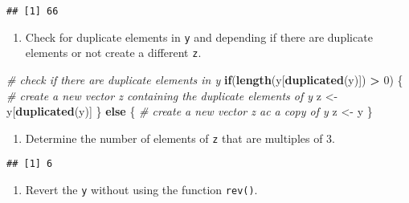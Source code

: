 \documentclass[
]{article}
\newenvironment{Shaded}{\begin{snugshade}}{\end{snugshade}}
\newcommand{\CommentTok}[1]{\textcolor[rgb]{0.56,0.35,0.01}{\textit{#1}}}
\newcommand{\ControlFlowTok}[1]{\textcolor[rgb]{0.13,0.29,0.53}{\textbf{#1}}}
\newcommand{\DecValTok}[1]{\textcolor[rgb]{0.00,0.00,0.81}{#1}}
\newcommand{\KeywordTok}[1]{\textcolor[rgb]{0.13,0.29,0.53}{\textbf{#1}}}
\newcommand{\NormalTok}[1]{#1}
\newcommand{\OperatorTok}[1]{\textcolor[rgb]{0.81,0.36,0.00}{\textbf{#1}}}
\newcommand{\StringTok}[1]{\textcolor[rgb]{0.31,0.60,0.02}{#1}}
\providecommand{\tightlist}{%
  \setlength{\itemsep}{0pt}\setlength{\parskip}{0pt}}
\begin{document}
\begin{verbatim}
## [1] 66
\end{verbatim}

\begin{enumerate}
\def\labelenumi{\arabic{enumi}.}
\setcounter{enumi}{2}
\tightlist
\item
  Check for duplicate elements in \texttt{y} and depending if there are
  duplicate elements or not create a different \texttt{z}.
\end{enumerate}

\begin{Shaded}
\begin{Highlighting}[]
\CommentTok{# check if there are duplicate elements in y}
\ControlFlowTok{if}\NormalTok{(}\KeywordTok{length}\NormalTok{(y[}\KeywordTok{duplicated}\NormalTok{(y)]) }\OperatorTok{>}\StringTok{ }\DecValTok{0}\NormalTok{) \{}
  \CommentTok{# create a new vector z containing the duplicate elements of y}
\NormalTok{  z <-}\StringTok{ }\NormalTok{y[}\KeywordTok{duplicated}\NormalTok{(y)]}
\NormalTok{\} }\ControlFlowTok{else}\NormalTok{ \{}
  \CommentTok{# create a new vector z ac a copy of y}
\NormalTok{  z <-}\StringTok{ }\NormalTok{y}
\NormalTok{\}}
\end{Highlighting}
\end{Shaded}

\begin{enumerate}
\def\labelenumi{\arabic{enumi}.}
\setcounter{enumi}{3}
\tightlist
\item
  Determine the number of elements of \texttt{z} that are multiples of
  3.
\end{enumerate}

\begin{Shaded}
\end{Shaded}

\begin{verbatim}
## [1] 6
\end{verbatim}

\begin{enumerate}
\def\labelenumi{\arabic{enumi}.}
\setcounter{enumi}{4}
\tightlist
\item
  Revert the \texttt{y} without using the function \texttt{rev()}.
\end{enumerate}
\end{document}
